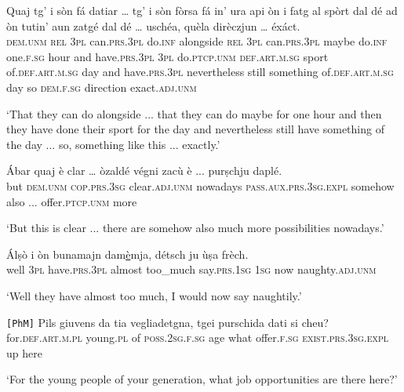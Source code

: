 \begin{linenumbers}
	\gll Quaj tg’ i sòn fá datiar … tg’ i sòn fòrsa fá in’ ura api òn i fatg al spòrt dal dé ad òn tutin’ aun zatgé dal dé … uschéa, quèla dirèczjun … éxáct.\\
	\textsc{dem.unm} \textsc{rel} \textsc{3pl} can.\textsc{prs.3pl} do.\textsc{inf} alongside {} \textsc{rel} \textsc{3pl} can.\textsc{prs.3pl} maybe do.\textsc{inf} one.\textsc{f.sg} hour and have.\textsc{prs.3pl} \textsc{3pl} do.\textsc{ptcp.unm} \textsc{def.art.m.sg} sport of.\textsc{def.art.m.sg} day and have.\textsc{prs.3pl} nevertheless still something of.\textsc{def.art.m.sg} day {} so \textsc{dem.f.sg} direction {} exact.\textsc{adj.unm}\\
\end{linenumbers}
\medskip
\glt `That they can do alongside ... that they can do maybe for one hour and then they have done their sport for the day and nevertheless still have something of the day ... so, something like this ... exactly.'
\medskip

\begin{linenumbers}
	\gll Ábar quaj è clar … òzaldé végni zacù è ...  purṣchju daplé.   \\
	but \textsc{dem.unm} \textsc{cop.prs.3sg} clear.\textsc{adj.unm} {} nowadays \textsc{pass.aux.prs.3sg.expl} somehow also ... offer.\textsc{ptcp.unm} more\\
\end{linenumbers}
\medskip
\glt `But this is clear ... there are somehow also much more possibilities nowadays.'
\medskip

\begin{linenumbers}
	\gll  Álṣò i òn bunamajn dam\underline{è}mja, détsch ju ùṣa frèch.\footnotemark{}  \\
	well \textsc{3pl} have.\textsc{prs.3pl} almost too\_much say.\textsc{prs.1sg} \textsc{1sg} now naughty.\textsc{adj.unm}\\
\end{linenumbers}
\medskip
\glt `Well they have almost too much, I would now say naughtily.'
\medskip

\begin{linenumbers}
	\gll  \texttt{[PhM]} Pils giuvens da tia vegliadetgna, tgei purschida dati si cheu?  \\
	{} for.\textsc{def.art.m.pl} young.\textsc{pl} of \textsc{poss.2sg.f.sg} age what offer.\textsc{f.sg} \textsc{exist.prs.3sg.expl} up here\\
\end{linenumbers}
\medskip
\glt `For the young people of your generation, what job opportunities are there here?'
\medskip

